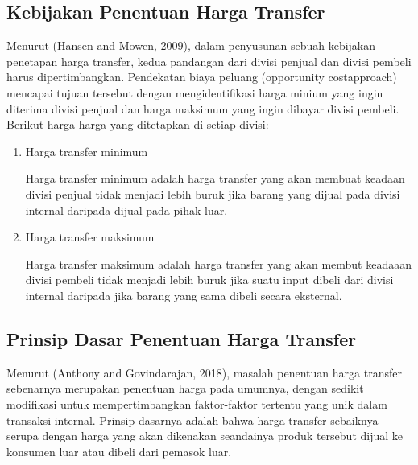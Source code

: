 \begin{spacing}{1.5}
	

\subsection{Kebijakan Penentuan Harga Transfer}

Menurut (Hansen and Mowen, 2009), dalam penyusunan sebuah kebijakan penetapan harga transfer, kedua pandangan dari divisi penjual dan divisi pembeli harus dipertimbangkan. Pendekatan biaya peluang (opportunity costapproach) mencapai tujuan tersebut dengan mengidentifikasi harga minium yang ingin diterima divisi penjual dan harga maksimum yang ingin dibayar divisi pembeli. Berikut harga-harga yang ditetapkan di setiap divisi:

\begin{enumerate}
	\item Harga transfer minimum
	
	Harga transfer minimum adalah harga transfer yang akan membuat keadaan divisi penjual tidak menjadi lebih buruk jika barang yang dijual pada divisi internal daripada dijual pada pihak luar.

	\item Harga transfer maksimum
	
	Harga transfer maksimum adalah harga transfer yang akan membut keadaaan divisi pembeli tidak menjadi lebih buruk jika suatu input dibeli dari divisi internal daripada jika barang yang sama dibeli secara eksternal. 
\end{enumerate}

\subsection{Prinsip Dasar Penentuan Harga Transfer}

Menurut (Anthony and Govindarajan, 2018), masalah penentuan harga transfer sebenarnya merupakan penentuan harga pada umumnya, dengan sedikit modifikasi untuk mempertimbangkan faktor-faktor tertentu yang unik dalam transaksi internal. Prinsip dasarnya adalah bahwa harga transfer sebaiknya serupa dengan harga yang akan dikenakan seandainya produk tersebut dijual ke konsumen luar atau dibeli dari pemasok luar.


\end{spacing}
